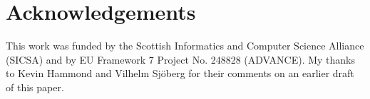 \documentclass{jfp1}
\newcounter{per}
\begin{document}




%





%

%



\section*{Acknowledgements}

This work was funded by the Scottish Informatics and Computer Science
Alliance (SICSA) and by EU Framework 7 Project No. 248828 (ADVANCE).
My thanks to Kevin Hammond and Vilhelm Sj\"{o}berg for their comments 
on an earlier draft of this paper.




\appendix





%
\end{document}
